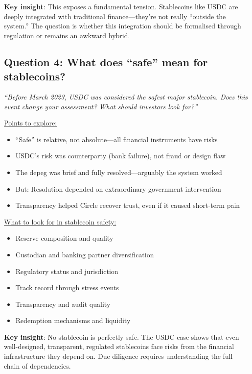 \documentclass[11pt]{article}
\begin{document}
\medskip
\noindent\textbf{Key insight}: This exposes a fundamental tension. Stablecoins like USDC are deeply integrated with traditional finance---they're not really ``outside the system.'' The question is whether this integration should be formalised through regulation or remains an awkward hybrid.

\subsection*{Question 4: What does ``safe'' mean for stablecoins?}

\textit{``Before March 2023, USDC was considered the safest major stablecoin. Does this event change your assessment? What should investors look for?''}

\medskip
\noindent\underline{Points to explore:}
\begin{itemize}[leftmargin=*]
\item ``Safe'' is relative, not absolute---all financial instruments have risks
\item USDC's risk was counterparty (bank failure), not fraud or design flaw
\item The depeg was brief and fully resolved---arguably the system worked
\item But: Resolution depended on extraordinary government intervention
\item Transparency helped Circle recover trust, even if it caused short-term pain
\end{itemize}

\medskip
\noindent\underline{What to look for in stablecoin safety:}
\begin{itemize}[leftmargin=*]
\item Reserve composition and quality
\item Custodian and banking partner diversification
\item Regulatory status and jurisdiction
\item Track record through stress events
\item Transparency and audit quality
\item Redemption mechanisms and liquidity
\end{itemize}

\medskip
\noindent\textbf{Key insight}: No stablecoin is perfectly safe. The USDC case shows that even well-designed, transparent, regulated stablecoins face risks from the financial infrastructure they depend on. Due diligence requires understanding the full chain of dependencies.
\end{document}
